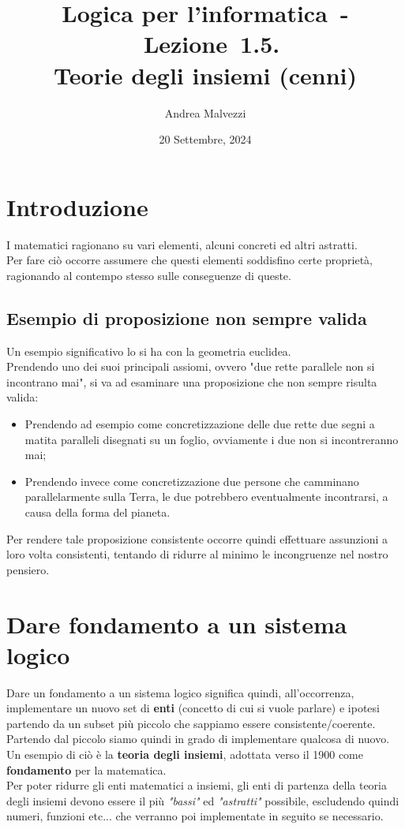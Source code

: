 \documentclass[12pt]{article}
\author{Andrea Malvezzi}
\title{\textbf{Logica per l'informatica~-~Lezione~1.5.\\Teorie degli insiemi (cenni)}}
\date{20 Settembre, 2024}
\begin{document}
\maketitle
\pagebreak
\section{Introduzione}
I matematici ragionano su vari elementi, alcuni concreti ed altri astratti.\\
Per fare ciò occorre assumere che questi elementi soddisfino certe proprietà, ragionando al contempo stesso sulle conseguenze di queste.
\subsection{Esempio di proposizione non sempre valida}
Un esempio significativo lo si ha con la geometria euclidea.\\
Prendendo uno dei suoi principali assiomi, ovvero "due rette parallele non si incontrano mai", si va ad esaminare una proposizione che non sempre risulta valida:
\begin{itemize}
    \item Prendendo ad esempio come concretizzazione delle due rette due segni a matita paralleli disegnati su un foglio, ovviamente i due non si incontreranno mai;
    \item Prendendo invece come concretizzazione due persone che camminano parallelarmente sulla Terra, le due potrebbero eventualmente incontrarsi, a causa della forma del pianeta.
\end{itemize}
Per rendere tale proposizione consistente occorre quindi effettuare assunzioni a loro volta consistenti, tentando di ridurre al minimo le incongruenze nel nostro pensiero.
\pagebreak
\section{Dare fondamento a un sistema logico}
Dare un fondamento a un sistema logico significa quindi, all'occorrenza, implementare un nuovo set di \textbf{enti} (concetto di cui si vuole parlare) e ipotesi partendo da un subset più piccolo che sappiamo essere consistente/coerente.\\
Partendo dal piccolo siamo quindi in grado di implementare qualcosa di nuovo.\\
Un esempio di ciò è la \textbf{teoria degli insiemi}, adottata verso il 1900 come \textbf{fondamento} per la matematica.\\
Per poter ridurre gli enti matematici a insiemi, gli enti di partenza della teoria degli insiemi devono essere il più \textit{"bassi"} ed \textit{"astratti"} possibile, escludendo quindi numeri, funzioni etc... che verranno poi implementate in seguito se necessario.
\end{document}
